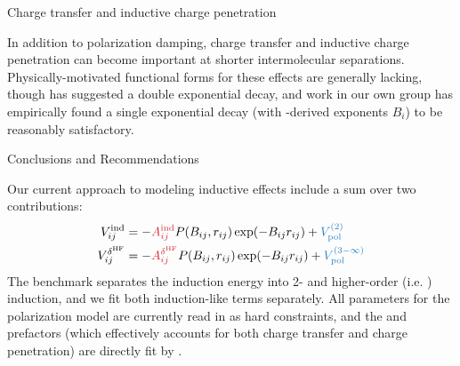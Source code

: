 
\begin{paragraph}{Charge transfer and inductive charge penetration}

In addition to polarization damping, charge transfer and inductive charge
penetration can become important at shorter intermolecular separations.
Physically-motivated functional forms for these effects are generally lacking,
though \citet{Misquitta2013} has suggested a double exponential decay,
and work in our own group has empirically found a single exponential decay
(with \isa-derived exponents $B_i$) to be reasonably satisfactory.

\end{paragraph}

\begin{paragraph}{Conclusions and Recommendations}

Our current approach to modeling inductive effects include a sum
over two contributions:
%
\begin{align}
\vind_{ij} &= -\textcolor{fit}{\Aind{ij}} P(\B, r_{ij}) \exp(-\B r_{ij}) + \textcolor{mon}{\vdrudeind} \\
\vdhf_{ij} &= -\textcolor{fit}{\Adhf{ij}} P(\B, r_{ij}) \exp(-\B r_{ij}) + \textcolor{mon}{\vdrudescf}
\end{align}
%
The \sapt benchmark separates the induction energy into 2- and higher-order
(i.e. \dhf) induction, and we fit both induction-like terms
separately.\footnotemark{} 
All parameters for the polarization model \vdrude are currently read in as hard
constraints, and the  and  prefactors (which effectively accounts for both
charge transfer and charge penetration) are directly fit by \pointer.


\end{paragraph}

